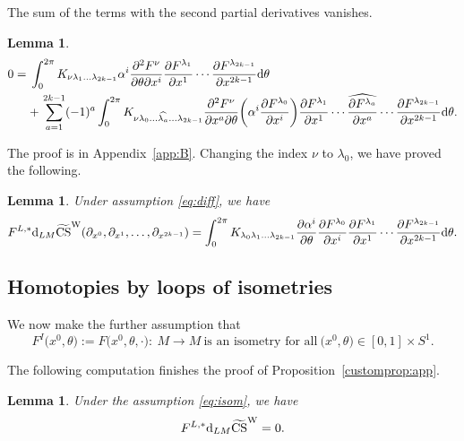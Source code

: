 \documentclass[pdftex]{sigma}
\numberwithin{equation}{section}
\newtheorem{Lemma}[Theorem]{Lemma}
\theoremstyle{definition}
\newcommand{\bm}{ M}
\newcommand{\ocs}{\widetilde{{\rm CS}}}
\begin{document}
The sum of the terms with the second partial derivatives vanishes.
\begin{Lemma}\label{lem:2.3a}
\begin{align*}%
 0={}& \int_0^{2\pi} K_{\nu \lambda_1\dots\lambda_{2k-1}}
 \alpha^i\frac{\partial^2 F^\nu}{\partial\theta \partial x^i}
\frac{\partial F^{\lambda_1}}{\partial x^1}
\cdots
\frac{\partial F^{\lambda_{2k-1}}}{\partial x^{2k-1}}
 {\rm d}\theta\nonumber \\
&{+}\, \sum_{a=1}^{2k-1}
(-1)^a
\int_0^{2\pi}
K_{\nu \lambda_0 \dots \widehat{\lambda_a} \dots \lambda_{2k-1}}
\frac{\partial^2 F^\nu}{\partial x^a \partial \theta} \biggl( \alpha^i\frac{\partial F^{\lambda_0}}{\partial x^i}
\biggr) \frac{\partial F^{\lambda_1}}{\partial x^1}
\cdots
\widehat{\frac{\partial F^{\lambda_a}}{\partial x^a}}
\cdots
\frac{\partial F^{\lambda_{2k-1}}}{\partial x^{2k-1}}
 {\rm d}\theta.\nonumber
 \end{align*}
 \end{Lemma}

 The proof is in Appendix~\ref{app:B}.
 Changing the index $\nu$ to $\lambda_0$, we have proved the following.
 \begin{Lemma}\label{lem:2.2}
 Under assumption \eqref{eq:diff}, we have
 \begin{equation*}%
 F^{L,*} {\rm d}_{L{\bm}} \ocs^{\rm W} (\partial_{x^0}, \partial_{x^1},\dots, \partial_{x^{2k-1}}) =
 \int_0^{2\pi} K_{\lambda_0 \lambda_1\dots\lambda_{2k-1}}
\frac{\partial \alpha^i}{\partial\theta} \frac{\partial F^{\lambda_0}}{\partial x^i}
\frac{\partial F^{\lambda_1}}{\partial x^1}
\cdots
\frac{\partial F^{\lambda_{2k-1}}}{\partial x^{2k-1}}
 {\rm d}\theta.
 \end{equation*}
 \end{Lemma}

 \subsection{Homotopies by loops of isometries}%
We now make the further assumption that
\begin{equation}\label{eq:isom}
 F^I\bigl(x^0,\theta\bigr) := F\bigl(x^0, \theta,\cdot\bigr)\colon\ \bm\to\bm \ \text{is an isometry for all} \ \bigl(x^0,\theta\bigr)\in [0,1]\times S^1.
\end{equation}

The following computation finishes the proof of Proposition~\ref{customprop:app}.
\begin{Lemma}\label{lem:2.3}
 Under the assumption \eqref{eq:isom}, we have
 \[F^{L,*} {\rm d}_{L{\bm}} \ocs^{\rm W}=0.\]
\end{Lemma}
\end{document}
